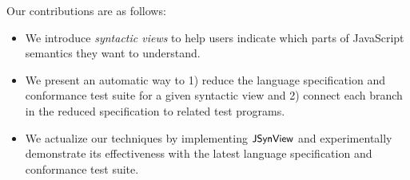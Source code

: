Our contributions are as follows:
\begin{itemize}
  \item We introduce \textit{syntactic views} to help users indicate which parts
    of JavaScript semantics they want to understand.

  \item We present an automatic way to 1) reduce the language specification and
    conformance test suite for a given syntactic view and 2) connect each branch
    in the reduced specification to related test programs.

  \item We actualize our techniques by implementing $\textsf{\small JSynView}$ and experimentally
    demonstrate its effectiveness with the latest language specification and
    conformance test suite.
\end{itemize}
